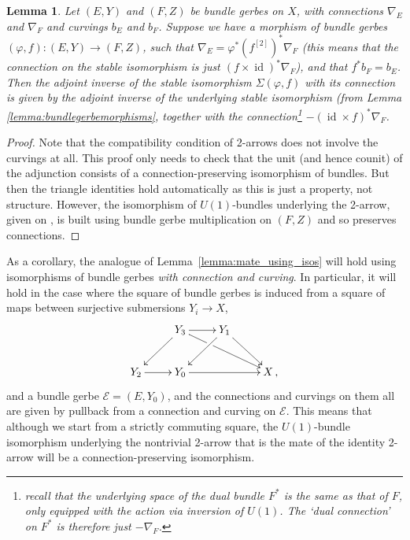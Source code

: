 \documentclass[12pt]{amsart}
\DeclareMathOperator{\id}{id}
\theoremstyle{plain}
\newtheorem{lemma}[theorem]{Lemma}
\theoremstyle{definition}
\theoremstyle{remark}
\numberwithin{equation}{section}
\newcommand{\cE}{{\mathcal E}}
\newcommand{\<}{\langle}
\renewcommand{\>}{\rangle}
\begin{document}
\begin{lemma}\label{lemma:bundlegerbemorphisms_w_conn_curv}
Let $(E,Y)$ and $(F,Z)$ be bundle gerbes on $X$, with connections $\nabla_E$ and $\nabla_F$ and curvings $b_E$ and $b_F$. 
Suppose we have a morphism of bundle gerbes $(\varphi,f)\colon (E,Y)\to (F,Z)$, such that $\nabla_E=\varphi^*(f^{[2]})^*\nabla_F$ (this means that the connection on the stable isomorphism is just $(f\times \id)^*\nabla_F$), and that $f^*b_F = b_E$.
Then the adjoint inverse of the stable isomorphism $\Sigma(\varphi,f)$ with its connection is given by the adjoint inverse of the underlying stable isomorphism (from Lemma \ref{lemma:bundlegerbemorphisms}, together with the connection\footnote{recall that the underlying space of the dual bundle $F^*$ is the same as that of $F$, only equipped with the action via inversion of $U(1)$. The `dual connection' on $F^*$ is therefore just $-\nabla_F$.} $-(\id\times f)^*\nabla_F$.
\end{lemma}

\begin{proof}
Note that the compatibility condition of 2-arrows does not involve the curvings at all.
This proof only needs to check that the unit (and hence counit) of the adjunction consists of a connection-preserving isomorphism of bundles. 
But then the triangle identities hold automatically as this is just a property, not structure.
However, the isomorphism of $U(1)$-bundles underlying the 2-arrow, given on \cite[page 33]{StevPhD}, is built using bundle gerbe multiplication on $(F,Z)$ and so preserves connections.
\end{proof}

As a corollary, the analogue of Lemma~\ref{lemma:mate_using_isos} will hold using isomorphisms of bundle gerbes \emph{with connection and curving}.
In particular, it will hold in the case where the square of bundle gerbes is induced from a square of maps between surjective submersions $Y_i\to X$,
\[
	\xymatrix{
		&Y_3 \ar[r] \ar[dl] \ar[drr]|!{[r];[d]}{\hole} & Y_1 \ar[dl] \ar[dr]\\
		Y_2 \ar[r] & Y_0 \ar[rr]&& X\,,\\
	}
\]
and a bundle gerbe $\cE = (E,Y_0)$, and the connections and curvings on them all are given by pullback from a connection and curving on $\cE$.
This means that although we start from a strictly commuting square, the $U(1)$-bundle isomorphism underlying the nontrivial 2-arrow that is the mate of the identity 2-arrow will be a connection-preserving isomorphism.
\end{document}
